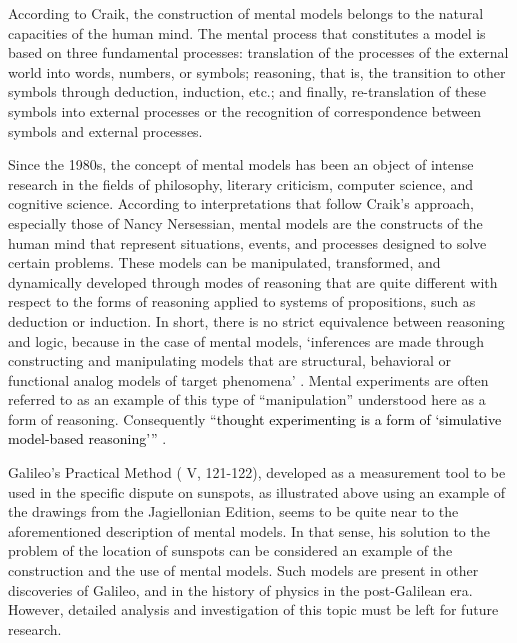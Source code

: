\begin{artengenv}
According to Craik, the construction of mental models belongs to the natural capacities of the human mind. The mental
process that constitutes a model is based on three fundamental processes: translation of the processes of the external
world into words, numbers, or symbols; reasoning, that is, the transition to other symbols through deduction,
induction, etc.; and finally, re-translation of these symbols into external processes or the recognition of
correspondence between symbols and external processes.

Since the 1980s, the concept of mental models has been an object of intense research in the fields of philosophy,
literary criticism, computer science, and cognitive science. According to interpretations that follow Craik’s approach,
especially those of Nancy Nersessian, mental models are the constructs of the human mind that represent situations,
events, and processes designed to solve certain problems. These models can be manipulated, transformed, and dynamically
developed through modes of reasoning that are quite different with respect to the forms of reasoning applied to systems
of propositions, such as deduction or induction. In short, there is no strict equivalence between reasoning and logic,
because in the case of mental models, ‘inferences are made through constructing and manipulating models that are
structural, behavioral or functional analog models of target phenomena’
\parencite[p.184]{nersessian_creating_2008}.
Mental experiments are often referred to as an example of this type of ``manipulation'' understood here as a form
of reasoning. Consequently ``\textcolor{black}{thought experimenting is a form of ‘simulative model-based reasoning’''}
\parencite[p.291]{nersessian_theoreticians_1992}.

Galileo’s Practical Method ( V, 121-122), developed as a measurement tool to be used in the specific dispute on
sunspots, as illustrated above using an example of the drawings from the Jagiellonian Edition, seems to be quite near
to the aforementioned description of mental models. In that sense, his solution to the problem of the location of
sunspots can be considered an example of the construction and the use of mental models. Such models are present in
other discoveries of Galileo, and in the history of physics in the post-Galilean era. However, detailed analysis and
investigation of this topic must be left for future research.




\end{artengenv}

